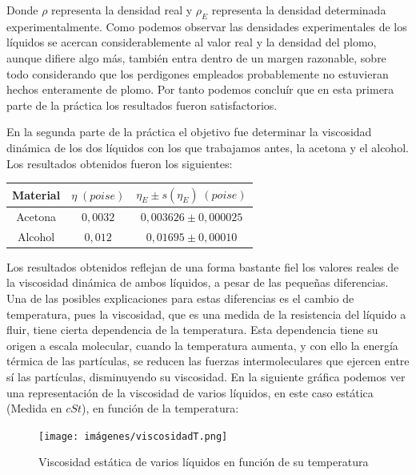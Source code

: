 \documentclass[a4paper,12pt,titlepage]{report}
\begin{document}
Donde $\rho$ representa la densidad real y $\rho_E$ representa la densidad determinada experimentalmente. Como podemos observar las densidades experimentales de los líquidos se acercan considerablemente al valor real y la densidad del plomo, aunque difiere algo más, también entra dentro de un margen razonable, sobre todo considerando que los perdigones empleados probablemente no estuvieran hechos enteramente de plomo. Por tanto podemos concluír que en esta primera parte de la práctica los resultados fueron satisfactorios.

\par En la segunda parte de la práctica el objetivo fue determinar la viscosidad dinámica de los dos líquidos con los que trabajamos antes, la acetona y el alcohol. Los resultados obtenidos fueron los siguientes:

\begin{table}[h!]
    \centering
    \begin{tabular}{|c|c|c|}
        \hline
        Material & $\eta \; (poise)$ & $\eta_E \pm s(\eta_E) \; (poise)$ \\ \hline
        Acetona & $0,0032$ & $0,003626 \pm 0,000025$ \\ \hline
        Alcohol &$0,012$ & $0,01695 \pm  0,00010$\\ \hline
    \end{tabular}
\end{table}

Los resultados obtenidos reflejan de una forma bastante fiel los valores reales de la viscosidad dinámica de ambos líquidos, a pesar de las pequeñas diferencias. Una de las posibles explicaciones para estas diferencias es el cambio de temperatura, pues la viscosidad, que es una medida de la resistencia del líquido a fluir, tiene cierta dependencia de la temperatura. Esta dependencia tiene su origen a escala molecular, cuando la temperatura aumenta, y con ello la energía térmica de las partículas, se reducen las fuerzas intermoleculares que ejercen entre sí las partículas, disminuyendo su viscosidad. En la siguiente gráfica podemos ver una representación de la viscosidad de varios líquidos, en este caso estática (Medida en $cSt$), en función de la temperatura:

\begin{figure}[h!]
    \centering
    \texttt{[image: imágenes/viscosidadT.png]}
    \caption{Viscosidad estática de varios líquidos en función de su temperatura}
\end{figure}
\end{document}
